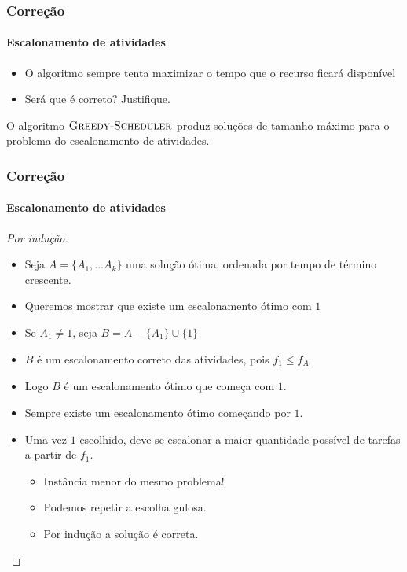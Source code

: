\documentclass{beamer}
\begin{document}
\begin{frame}
\frametitle{Correção}
\framesubtitle{Escalonamento de atividades}

\begin{itemize}
\item O algoritmo sempre tenta maximizar o tempo que o recurso ficará disponível
\item Será que é correto? Justifique.
\end{itemize}

\begin{theorem}
O algoritmo $\textnormal{\scshape Greedy-Scheduler}$ produz soluções de tamanho máximo para o
problema do escalonamento de atividades.
\end{theorem}

\end{frame}


\begin{frame}
\frametitle{Correção}
\framesubtitle{Escalonamento de atividades}

\begin{proof}[Por indução]
\begin{itemize}
\item Seja $A = \{ A_1, \ldots A_k \} $ uma solução ótima, ordenada por 
tempo de término crescente.
\item Queremos mostrar que existe um escalonamento ótimo com $1$
\item Se $A_1 \neq 1$, seja $B = A - \{ A_1 \} \cup \{ 1 \}$
\item $B$ é um escalonamento correto das atividades, pois $f_1 \le f_{A_1}$
\item Logo $B$ é um escalonamento ótimo que começa com $1$.
\item Sempre existe um escalonamento ótimo começando por $1$.
\item Uma vez $1$ escolhido, deve-se escalonar a maior quantidade possível
de tarefas a partir de $f_1$.
\begin{itemize}
\item Instância menor do mesmo problema!
\item Podemos repetir a escolha gulosa.
\item Por indução a solução é correta.
\end{itemize}
\end{itemize}
\end{proof}

\end{frame}
\end{document}
